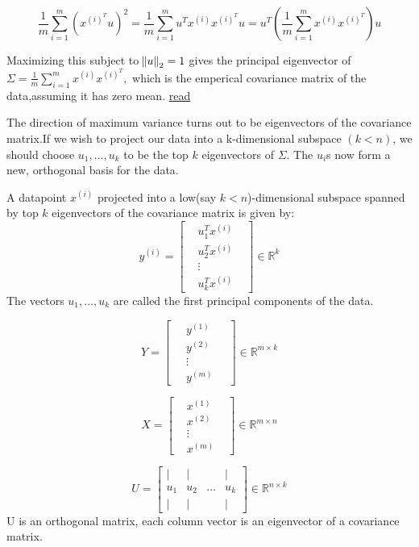 \documentclass[12pt]{article}
\begin{document}
 $$\frac{1}{m} \sum_{i=1}^{m}(x^{(i)^T}u)^{2} = \frac{1}{m} \sum_{i=1}^{m} u^{T}x^{(i)}x^{(i)^T}u = u^{T} \left(\frac{1}{m} \sum_{i=1}^{m} x^{(i)}x^{(i)^T} \right)u$$
 
 Maximizing this subject to  $\norm{u}_{2}=1$ gives the principal eigenvector of $\Sigma = \frac{1}{m} \sum_{i=1}^{m} x^{(i)}x^{(i)^T} ,$ which is the emperical covariance matrix of the data,assuming it has zero mean. \href{https://math.stackexchange.com/questions/1199852/maximize-the-value-of-vtav}{read}
 
 The direction of maximum variance turns out to be eigenvectors of the covariance matrix.If we wish to project our data into a k-dimensional subspace $(k < n)$, we should choose $u_{1}, ..., u_{k}$ to be the top $k$ eigenvectors of $\Sigma$. The $u_{i}$s now form a new, orthogonal basis for the data.
 
 A datapoint $x^{(i)}$ projected into a low(say $k<n$)-dimensional subspace  spanned by top $k$ eigenvectors of the covariance matrix is given by:
 $$y^{(i)} =\begin{bmatrix} 
 	& u_{1}^{T}x^{(i)} &  \\
 	& u_{2}^{T}x^{(i)} &\\
 	& \vdots & \\
 	& u_{k}^{T}x^{(i)} &
 \end{bmatrix}  \in \mathbb{R}^{k}$$
 The vectors  $u_{1}, ..., u_{k}$ are called the first principal components of the data.
 
  $$ Y =\begin{bmatrix} 
 \	& y^{(1)} & \ \\
 \	& y^{(2)} & \ \\
 \	& \vdots &  \ \\
 \	& y^{(m)} &\
 \end{bmatrix}  \in \mathbb{R}^{m \times k}$$
 
 
 
 $$ X =\begin{bmatrix} 
 & x^{(1)} &  \\
 & x^{(2)} &\\
 & \vdots & \\
 & x^{(m)} &
 \end{bmatrix}  \in \mathbb{R}^{m \times n}$$
 
$$ U =\begin{bmatrix} 
\vert & \vert&  &\vert \\
u_{1} & u_{2} & \hdots & u_{k}\\
 
 \vert & \vert&  &\vert
 \end{bmatrix}  \in \mathbb{R}^{n \times k}$$ U is an orthogonal matrix, each column vector is an eigenvector of a  covariance matrix.
 
\end{document}
